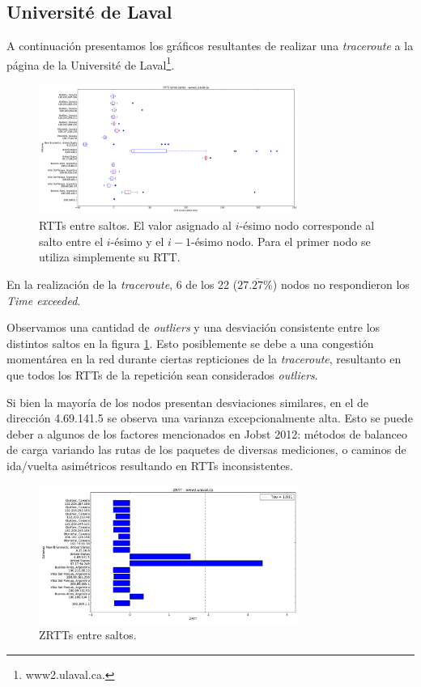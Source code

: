 \subsection{Université de Laval}

A continuación presentamos los gráficos resultantes de realizar una \textit{traceroute} a la página de la Université de Laval\footnote{www2.ulaval.ca.}.

\begin{figure}[H]
    \centering
    \includegraphics[width=8.5cm]{img/grafico1-www2-ulaval-ca.pdf}
    \caption{\normalfont RTTs entre saltos. El valor asignado al $i$-ésimo nodo corresponde al salto entre el $i$-ésimo y el $i - 1$-ésimo nodo. Para el primer nodo se utiliza simplemente su RTT.}
    \label{graf1L}
\end{figure}

\par En la realización de la \textit{traceroute}, 6 de los 22 ($27.\overline{27}\%$) nodos no respondieron los \textit{Time exceeded}.

\par Observamos una cantidad de \textit{outliers} y una desviación consistente entre los distintos saltos en la figura \ref{graf1L}.
Esto posiblemente se debe a una congestión momentárea en la red durante ciertas repticiones de la \textit{traceroute}, resultanto en que todos los RTTs de la repetición sean considerados \textit{outliers}.

\par Si bien la mayoría de los nodos presentan desviaciones similares, en el de dirección 4.69.141.5 se observa una varianza excepcionalmente alta.
Esto se puede deber a algunos de los factores mencionados en Jobst 2012\cite{anomalias}: métodos de balanceo de carga variando las rutas de los paquetes de diversas mediciones, o caminos de ida/vuelta asimétricos resultando en RTTs inconsistentes.

\begin{figure}[H]
    \centering
    \includegraphics[width=8.5cm]{img/grafico2-www2-ulaval-ca.pdf}
    \caption{\normalfont ZRTTs entre saltos.}
\end{figure}

